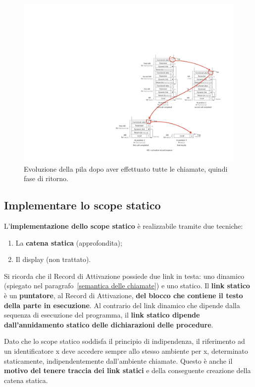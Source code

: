 \documentclass[a4paper]{article}
\begin{document}
	\begin{figure}[!htp]
		\centering
		\includegraphics[width=\textwidth]{img/eg-allocazione_memoria-2.pdf}
		\caption{Evoluzione della pila dopo aver effettuato tutte le chiamate, quindi fase di ritorno.}
	\end{figure}\newpage
	
	\subsection{Implementare lo scope statico}
	
	L'\textcolor{Red3}{\textbf{implementazione dello scope statico}} è realizzabile tramite due tecniche:
	\begin{enumerate}
		\item La \textcolor{Red3}{\textbf{catena statica}} (approfondita);
		\item Il display (non trattato).
	\end{enumerate}
	Si ricorda che il Record di Attivazione possiede due link in testa: uno dinamico (spiegato nel paragrafo~\ref{semantica delle chiamate}) e uno statico. Il \textbf{link statico} è un \textbf{puntatore}, al Record di Attivazione, \textbf{del blocco che contiene il testo della parte in esecuzione}. Al contrario del link dinamico che dipende dalla sequenza di esecuzione del programma, il \textbf{link statico dipende dall'annidamento statico delle dichiarazioni delle procedure}.\newline
	
	\noindent
	Dato che lo scope statico soddisfa il principio di indipendenza, il riferimento ad un identificatore \textsf{x} deve accedere sempre allo stesso ambiente per \textsf{x}, determinato staticamente, indipendentemente dall'ambiente chiamate. Questo è anche il \textbf{motivo del tenere traccia dei link statici} e della conseguente creazione della catena statica.\newline
	
\end{document}
